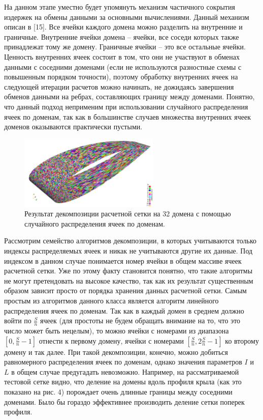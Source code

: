 На данном этапе уместно будет упомянуть механизм частичного сокрытия издержек на обмены данными за основными вычислениями.
Данный механизм описан в [15].
Все ячейки каждого домена можно разделить на внутренние и граничные.
Внутренние ячейки домена -- ячейки, все соседи которых также принадлежат тому же домену.
Граничные ячейки -- это все остальные ячейки. Ценность внутренних ячеек состоит в том, что они не участвуют в обменах данными с соседними доменами (если не используются разностные схемы с повышенным порядком точности), поэтому обработку внутренних ячеек на следующей итерации расчетов можно начинать, не дожидаясь завершения обменов данными на ребрах, составляющих границу между доменами.
Понятно, что данный подход неприменим при использовании случайного распределения ячеек по доменам, так как в большинстве случаев множества внутренних ячеек доменов оказываются практически пустыми.

\begin{figure}[ht]
	\centering
		\includegraphics[width=0.6\textwidth]{./pics/text_2_decompsurf/wing_random_32.png}
	\caption{Результат декомпозиции расчетной сетки на 32 домена с помощью случайного распределения ячеек по доменам.}
	\label{fig:text_2_decompsurf_wing_random_32}
\end{figure}

Рассмотрим семейство алгоритмов декомпозиции, в которых учитываются только индексы распределяемых ячеек и никак не учитываются другие их данные.
Под индексом в данном случае понимается номер ячейки в общем массиве ячеек расчетной сетки.
Уже по этому факту становится понятно, что такие алгоритмы не могут претендовать на высокое качество, так как их результат существенным образом зависит просто от порядка хранения данных расчетной сетки.
Самым простым из алгоритмов данного класса является алгоритм линейного распределения ячеек по доменам.
Так как в каждый домен в среднем должно войти по $\frac{S}{n}$ ячеек (для простоты не будем обращать внимание на то, что это число может быть нецелым), то можно ячейки с номерами из диапазона $[0, \frac{S}{n} - 1]$ отнести к первому домену, ячейки с номерами $[\frac{S}{n}, 2\frac{S}{n} - 1]$ ко второму домену и так далее.
При такой декомпозиции, конечно, можно добиться равномерного распределения ячеек по доменам, однако значения параметров $I$ и $L$ в общем случае предугадать невозможно.
Например, на рассматриваемой тестовой сетке видно, что деление на домены вдоль профиля крыла (как это показано на рис. 4) порождает очень длинные границы между соседними доменами.
Было бы гораздо эффективнее производить деление сетки поперек профиля.

